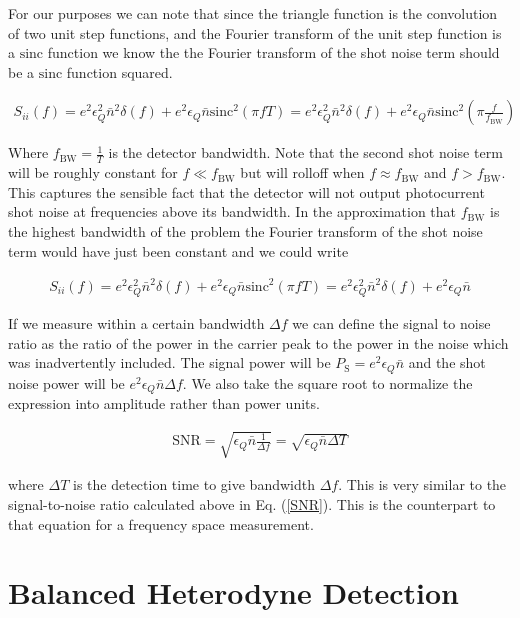 \documentclass[12pt]{article}
\newcommand{\sinc}{\text{sinc}}
\begin{document}
For our purposes we can note that since the triangle function is the convolution of two unit step functions, and the Fourier transform of the unit step function is a $\sinc$ function we know the the Fourier transform of the shot noise term should be a $\sinc$ function squared.

\begin{align}
S_{ii}(f) = e^2 \epsilon_Q^2 \bar{n}^2 \delta(f) + e^2 \epsilon_Q \bar{n} \sinc^2(\pi f T) = e^2 \epsilon_Q^2 \bar{n}^2 \delta(f) + e^2 \epsilon_Q \bar{n} \sinc^2\left(\pi \frac{f}{f_{\text{BW}}}\right)
\end{align}

Where $f_{\text{BW}} = \frac{1}{T}$ is the detector bandwidth. Note that the second shot noise term will be roughly constant for $f \ll f_{\text{BW}}$ but will rolloff when $f \approx f_{\text{BW}}$ and $f>f_{\text{BW}}$. This captures the sensible fact that the detector will not output photocurrent shot noise at frequencies above its bandwidth. In the approximation that $f_{\text{BW}}$ is the highest bandwidth of the problem the Fourier transform of the shot noise term would have just been constant and we could write

\begin{align}
S_{ii}(f) = e^2 \epsilon_Q^2 \bar{n}^2 \delta(f) + e^2 \epsilon_Q \bar{n} \sinc^2(\pi f T) = e^2 \epsilon_Q^2 \bar{n}^2 \delta(f) + e^2 \epsilon_Q \bar{n}
\end{align}

If we measure within a certain bandwidth $\Delta f$ we can define the signal to noise ratio as the ratio of the power in the carrier peak to the power in the noise which was inadvertently included. The signal power will be $P_{\text{S}} = e^2 \epsilon_Q \bar{n}$ and the shot noise power will be $e^2 \epsilon_Q \bar{n} \Delta f$. We also take the square root to normalize the expression into amplitude rather than power units.

\begin{align}
\text{SNR} = \sqrt{\epsilon_Q \bar{n} \frac{1}{\Delta f}} = \sqrt{\epsilon_Q \bar{n} \Delta T}
\end{align}

where $\Delta T$ is the detection time to give bandwidth $\Delta f$. This is very similar to the signal-to-noise ratio calculated above in Eq. (\ref{SNR}). This is the counterpart to that equation for a frequency space measurement.

\section{Balanced Heterodyne Detection}
\end{document}
